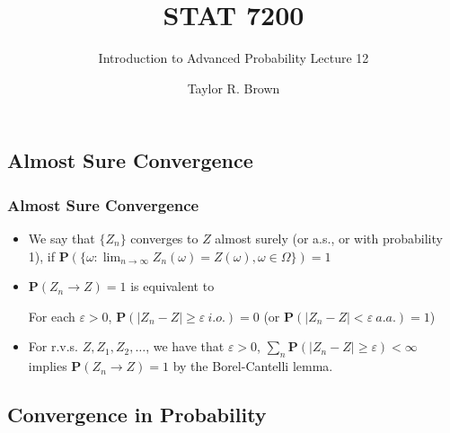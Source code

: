 \documentclass[handout]{beamer}
\title{STAT 7200}
\subtitle{Introduction to Advanced Probability \newline Lecture 12}
\author{Taylor R. Brown}
\institute{}
\date{}
\newcommand{\BP}{\mathbf{P}}
\begin{document}
\frame{\titlepage}

\section[Outline]{}
\frame{\tableofcontents}


\subsection{Almost Sure Convergence}


\frame
{
  \frametitle{Almost Sure Convergence}

   \begin{itemize}
       \item<1-> We say that $\{Z_n\}$ converges to $Z$ almost surely (or a.s., or with probability 1), if $\BP(\{\omega: \lim_{n\rightarrow \infty} Z_n(\omega)= Z(\omega) ,\omega \in \Omega\})=1$ \newline
     
       \item<2->$\BP(Z_n\rightarrow Z)=1$ is equivalent to
       
       For each $\varepsilon>0$, $\BP(|Z_n-Z| \geq \varepsilon \  i.o.)=0$ (or $\BP(|Z_n-Z| < \varepsilon \  a.a.)=1$) \newline
       
       
       \item<3-> For r.v.s. $Z, Z_1, Z_2, \ldots $, we have that $\varepsilon>0$, $\sum_n \BP(|Z_n-Z| \geq \varepsilon)<\infty$ implies $\BP(Z_n\rightarrow Z)=1$ by the Borel-Cantelli lemma.  
                
\end{itemize}
}



\subsection{Convergence in Probability}
\end{document}
